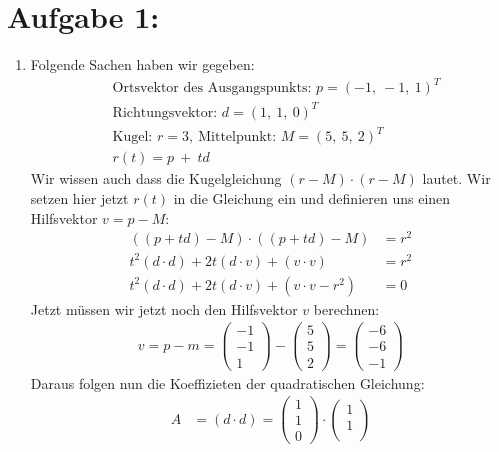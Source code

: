 \documentclass[11pt]{article}
\begin{document}
\section*{Aufgabe 1:}
\begin{enumerate}
  \item Folgende Sachen haben wir gegeben: \begin{align*}
  &\text{Ortsvektor des Ausgangspunkts: } p = (-1,~-1,~1)^T \\
  &\text{Richtungsvektor: } d = (1,~1,~0)^T \\
  &\text{Kugel: } r = 3, ~\text{Mittelpunkt: } M = (5,~5,~2)^T \\
  &r(t) = p~+~td
\end{align*}
Wir wissen auch dass die Kugelgleichung $(r-M) \cdot (r-M)$ lautet. Wir setzen hier jetzt $r(t)$ in die Gleichung ein und definieren uns einen Hilfsvektor $v=p-M$:
\begin{align*}
  ((p + td) - M) \cdot ((p + td) - M) &= r^2 \\
  t^2(d \cdot d) + 2t(d \cdot v) + (v \cdot v) &= r^2 \\
  t^2(d \cdot d) + 2t(d \cdot v) + (v \cdot v - r^2) &= 0 
\end{align*}
Jetzt müssen wir jetzt noch den Hilfsvektor $v$ berechnen: 
\begin{align*}
  v = p-m = \begin{pmatrix*}
    -1 \\
    -1 \\
    1   
  \end{pmatrix*} - \begin{pmatrix*}
    5\\
    5\\ 
    2
  \end{pmatrix*} = \begin{pmatrix*}
    -6\\
    -6\\
    -1
  \end{pmatrix*}
\end{align*}
Daraus folgen nun die Koeffizieten der quadratischen Gleichung:
\begin{align*}
  A &= (d \cdot d) = \begin{pmatrix*}
    1\\
    1\\
    0
  \end{pmatrix*} \cdot \begin{pmatrix*}
    1\\
    1\\

\end{pmatrix*}
\end{align*}
\end{enumerate}
\end{document}
